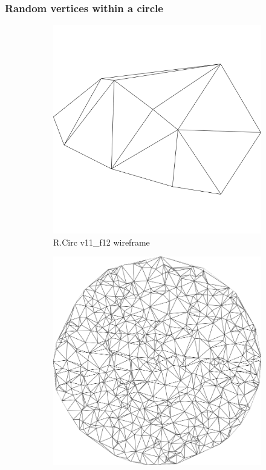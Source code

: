 \subsubsection{Random vertices within a circle}
\begin{figure}[ht]
\ffigbox
	{\begin{subfigure}[b]{0.48\linewidth}
		\includegraphics[width=1.0\linewidth,height=0.3\textheight,keepaspectratio]{data/synthetic_meshes/random_circle_tessellation_Dirac_delta_1_v11_f12_wireframe.png}
		\caption{R.Circ v11\_f12 wireframe}\label{fig:rcirc.a}
	\end{subfigure}
	\begin{subfigure}[b]{0.48\linewidth}
		\includegraphics[width=1.0\linewidth,height=0.3\textheight,keepaspectratio]{data/synthetic_meshes/random_circle_tessellation_Dirac_delta_10_v641_f1252_wireframe.png}

\end{subfigure}}
\end{figure}
